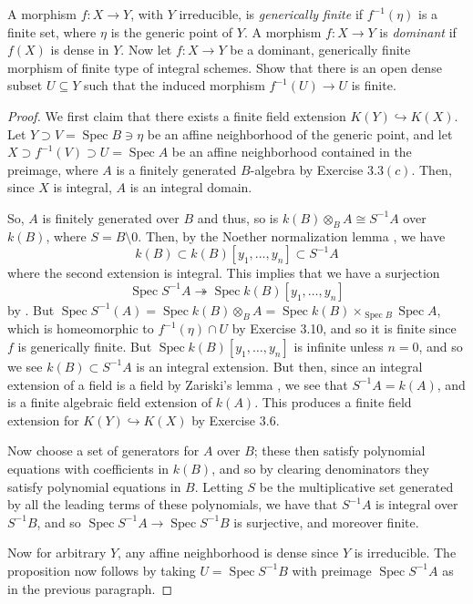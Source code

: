 \documentclass[10pt]{article}
\theoremstyle{definition}
\theoremstyle{remark}
\numberwithin{equation}{section}
\numberwithin{figure}{subsubsection}
\DeclareMathOperator{\Spec}{Spec}
\begin{document}
\begin{problem}
  A morphism $f \colon X \to Y$, with $Y$ irreducible, is \emph{generically finite} if $f^{-1}(\eta)$ is a finite set, where $\eta$ is the generic point of $Y$. A morphism $f\colon X \to Y$ is \emph{dominant} if $f(X)$ is dense in $Y$. Now let $f\colon X \to Y$ be a dominant, generically finite morphism of finite type of integral schemes. Show that there is an open dense subset $U \subseteq Y$ such that the induced morphism $f^{-1}(U) \to U$ is finite.
\end{problem}
\begin{proof}
  We first claim that there exists a finite field extension $K(Y) \hookrightarrow K(X)$. Let $Y \supset V = \Spec B \ni \eta$ be an affine neighborhood of the generic point, and let $X \supset f^{-1}(V) \supset U = \Spec A$ be an affine neighborhood contained in the preimage, where $A$ is a finitely generated $B$-algebra by Exercise $3.3(c)$. Then, since $X$ is integral, $A$ is an integral domain.
  \par So, $A$ is finitely generated over $B$ and thus, so is $k(B) \otimes_B A \cong S^{-1}A$ over $k(B)$, where $S = B \setminus 0$. Then, by the Noether normalization lemma \cite[14.G]{Mat70}, we have
  \begin{equation*}
    k(B) \subset k(B)[y_1,\ldots,y_n] \subset S^{-1}A
  \end{equation*}
  where the second extension is integral. This implies that we have a surjection
  \begin{equation*}
    \Spec S^{-1}A \twoheadrightarrow \Spec k(B)[y_1,\ldots,y_n]
  \end{equation*}
  by \cite[Exc.\ 5.10]{AM69}. But $\Spec S^{-1}(A) = \Spec k(B) \otimes_B A = \Spec k(B) \times_{\Spec B} \Spec A$, which is homeomorphic to $f^{-1}(\eta) \cap U$ by Exercise 3.10, and so it is finite since $f$ is generically finite. But $\Spec k(B)[y_1,\ldots,y_n]$ is infinite unless $n = 0$, and so we see $k(B) \subset S^{-1}A$ is an integral extension. But then, since an integral extension of a field is a field by Zariski's lemma \cite[Prop.~4.9]{Rei95}, we see that $S^{-1}A = k(A)$, and is a finite algebraic field extension of $k(A)$. This produces a finite field extension for $K(Y) \hookrightarrow K(X)$ by Exercise $3.6$.
  \par Now choose a set of generators for $A$ over $B$; these then satisfy polynomial equations with coefficients in $k(B)$, and so by clearing denominators they satisfy polynomial equations in $B$. Letting $S$ be the multiplicative set generated by all the leading terms of these polynomials, we have that $S^{-1}A$ is integral over $S^{-1}B$, and so $\Spec S^{-1}A \to \Spec S^{-1}B$ is surjective, and moreover finite.
  \par Now for arbitrary $Y$, any affine neighborhood is dense since $Y$ is irreducible. The proposition now follows by taking $U = \Spec S^{-1}B$ with preimage $\Spec S^{-1}A$ as in the previous paragraph.
\end{proof}
\end{document}
